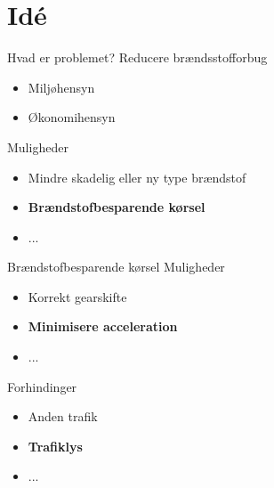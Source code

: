 \section{Idé}


\begin{frame}{Hvad er problemet?}
Reducere brændsstofforbug
\begin{itemize}
\item Miljøhensyn
\item Økonomihensyn
\end{itemize}

Muligheder
\begin{itemize}
\item Mindre skadelig eller ny type brændstof
\item \textbf{Brændstofbesparende kørsel}
\item ...
\end{itemize}
\end{frame}

\begin{frame}{Brændstofbesparende kørsel}
Muligheder
\begin{itemize}
\item Korrekt gearskifte
\item \textbf{Minimisere acceleration}
\item ...
\end{itemize}

Forhindinger
\begin{itemize}
\item Anden trafik
\item \textbf{Trafiklys}
\item ...
\end{itemize}

\end{frame}

